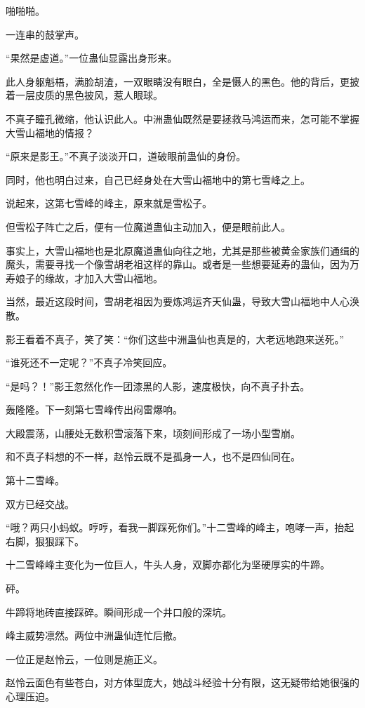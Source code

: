 
\begin{this_body}

啪啪啪。

一连串的鼓掌声。

“果然是虚道。”一位蛊仙显露出身形来。

此人身躯魁梧，满脸胡渣，一双眼睛没有眼白，全是慑人的黑色。他的背后，更披着一层皮质的黑色披风，惹人眼球。

不真子瞳孔微缩，他认识此人。中洲蛊仙既然是要拯救马鸿运而来，怎可能不掌握大雪山福地的情报？

“原来是影王。”不真子淡淡开口，道破眼前蛊仙的身份。

同时，他也明白过来，自己已经身处在大雪山福地中的第七雪峰之上。

说起来，这第七雪峰的峰主，原来就是雪松子。

但雪松子阵亡之后，便有一位魔道蛊仙主动加入，便是眼前此人。

事实上，大雪山福地也是北原魔道蛊仙向往之地，尤其是那些被黄金家族们通缉的魔头，需要寻找一个像雪胡老祖这样的靠山。或者是一些想要延寿的蛊仙，因为万寿娘子的缘故，才加入大雪山福地。

当然，最近这段时间，雪胡老祖因为要炼鸿运齐天仙蛊，导致大雪山福地中人心涣散。

影王看着不真子，笑了笑：“你们这些中洲蛊仙也真是的，大老远地跑来送死。”

“谁死还不一定呢？”不真子冷笑回应。

“是吗？！”影王忽然化作一团漆黑的人影，速度极快，向不真子扑去。

轰隆隆。下一刻第七雪峰传出闷雷爆响。

大殿震荡，山腰处无数积雪滚落下来，顷刻间形成了一场小型雪崩。

和不真子料想的不一样，赵怜云既不是孤身一人，也不是四仙同在。

第十二雪峰。

双方已经交战。

“哦？两只小蚂蚁。哼哼，看我一脚踩死你们。”十二雪峰的峰主，咆哮一声，抬起右脚，狠狠踩下。

十二雪峰峰主变化为一位巨人，牛头人身，双脚亦都化为坚硬厚实的牛蹄。

砰。

牛蹄将地砖直接踩碎。瞬间形成一个井口般的深坑。

峰主威势凛然。两位中洲蛊仙连忙后撤。

一位正是赵怜云，一位则是施正义。

赵怜云面色有些苍白，对方体型庞大，她战斗经验十分有限，这无疑带给她很强的心理压迫。


\end{this_body}
